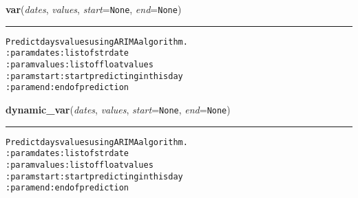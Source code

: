     \vspace{0.5ex}

\hspace{.8\funcindent}\begin{boxedminipage}{\funcwidth}

    \raggedright \textbf{var}(\textit{dates}, \textit{values}, \textit{start}={\tt None}, \textit{end}={\tt None})

    \vspace{-1.5ex}

    \rule{\textwidth}{0.5\fboxrule}
\setlength{\parskip}{2ex}
\begin{alltt}
Predict days values using ARIMA algorithm.
:param dates: list of str date
:param values: list of float values
:param start: start predicting in this day
:param end: end of prediction 
\end{alltt}

\setlength{\parskip}{1ex}
    \end{boxedminipage}

    \label{hal:ml:models:time_series:dynamic_var}

    \vspace{0.5ex}

\hspace{.8\funcindent}\begin{boxedminipage}{\funcwidth}

    \raggedright \textbf{dynamic\_var}(\textit{dates}, \textit{values}, \textit{start}={\tt None}, \textit{end}={\tt None})

    \vspace{-1.5ex}

    \rule{\textwidth}{0.5\fboxrule}
\setlength{\parskip}{2ex}
\begin{alltt}
Predict days values using ARIMA algorithm.
:param dates: list of str date
:param values: list of float values
:param start: start predicting in this day
:param end: end of prediction 
\end{alltt}

\setlength{\parskip}{1ex}
    \end{boxedminipage}

